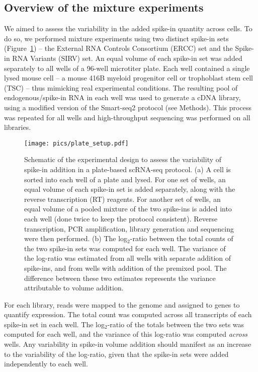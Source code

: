 \documentclass{article}
\begin{document}
\subsection{Overview of the mixture experiments}
We aimed to assess the variability in the added spike-in quantity across cells.
To do so, we performed mixture experiments using two distinct spike-in sets (Figure~\ref{fig:expdesign}) -- the External RNA Controls Consortium (ERCC) set and the Spike-in RNA Variants (SIRV) set.
An equal volume of each spike-in set was added separately to all wells of a 96-well microtiter plate.
Each well contained a single lysed mouse cell -- a mouse 416B myeloid progenitor cell or trophoblast stem cell (TSC) -- thus mimicking real experimental conditions.
The resulting pool of endogenous/spike-in RNA in each well was used to generate a cDNA library, using a modified version of the Smart-seq2 protocol (see Methods).
This process was repeated for all wells and high-throughput sequencing was performed on all libraries.

\begin{figure}[tbp]
\begin{center}
\texttt{[image: pics/plate\_setup.pdf]}
\end{center}
\caption{Schematic of the experimental design to assess the variability of spike-in addition in a plate-based scRNA-seq protocol.
(a) A cell is sorted into each well of a plate and lysed.
For one set of wells, an equal volume of each spike-in set is added separately, along with the reverse transcription (RT) reagents.
For another set of wells, an equal volume of a pooled mixture of the two spike-ins is added into each well (done twice to keep the protocol consistent).
Reverse transcription, PCR amplification, library generation and sequencing were then performed.
(b) The log$_2$-ratio between the total counts of the two spike-in sets was computed for each well.
The variance of the log-ratio was estimated from all wells with separate addition of spike-ins, and from wells with addition of the premixed pool.
The difference between these two estimates represents the variance attributable to volume addition.
}
\label{fig:expdesign}
\end{figure}

For each library, reads were mapped to the genome and assigned to genes to quantify expression.
The total count was computed across all transcripts of each spike-in set in each well.
The log$_2$-ratio of the totals between the two sets was computed for each well, and the variance of this log-ratio was computed \textit{across} wells.
Any variability in spike-in volume addition should manifest as an increase to the variability of the log-ratio, given that the spike-in sets were added independently to each well.
\end{document}

